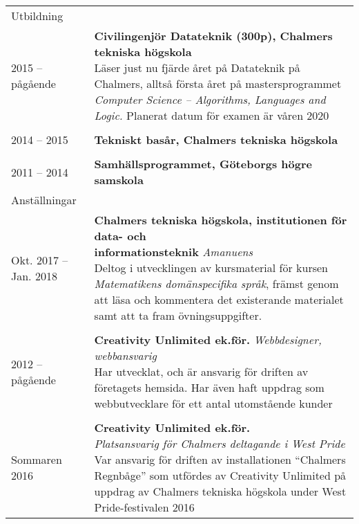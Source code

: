 \documentclass[letterpaper,11pt,oneside]{article}
\begin{document}
\noindent \begin{tabular}{@{} l l}
 \Large{Utbildning}   & \\
 2015 – pågående       & \parbox{5.0in}{\textbf{Civilingenjör Datateknik (300p), Chalmers tekniska högskola}
                        \\Läser just nu fjärde året på Datateknik på Chalmers,
                          alltså första året på mastersprogrammet \textit{Computer
                          Science -- Algorithms, Languages and Logic.} Planerat datum
                          för examen är våren 2020} \\
                      & \\
 2014 – 2015          & \textbf{Tekniskt basår, Chalmers tekniska högskola} \\
                      & \\
 2011 – 2014          & \textbf{Samhällsprogrammet, Göteborgs högre samskola}
                      & \\
 \Large{Anställningar}    & \\
 Okt. 2017 – Jan. 2018 & \parbox{5.0in}{\textbf{Chalmers tekniska högskola,
   institutionen för data- och \\informationsteknik} \textit{Amanuens} \\
                                  Deltog i utvecklingen av kursmaterial för
                                  kursen \textit{Matematikens domän\-specifika
                                  språk}, främst genom att läsa och kommentera det
                                  existerande materialet samt att ta fram
                                  övningsuppgifter.} \\
    & \\
 2012 – pågående & \parbox{5.0in}{\textbf{Creativity Unlimited ek.för.} \textit{Webbdesigner, webbansvarig} \\
                                  Har utvecklat, och är ansvarig för driften av företagets hemsida. Har även haft uppdrag som webbutvecklare för ett antal utomstående kunder  } \\
    & \\
Sommaren 2016 & \parbox{5.0in}{\textbf{Creativity Unlimited ek.för.} \\ \textit{Platsansvarig för Chalmers deltagande i West Pride} \\
                                Var ansvarig för driften av installationen
                                ``Chalmers Regnbåge'' som utfördes av Creativity
                                Unlimited på uppdrag av Chalmers tekniska högskola
                                under West Pride-festivalen 2016 }\\


\end{tabular}
\end{document}
